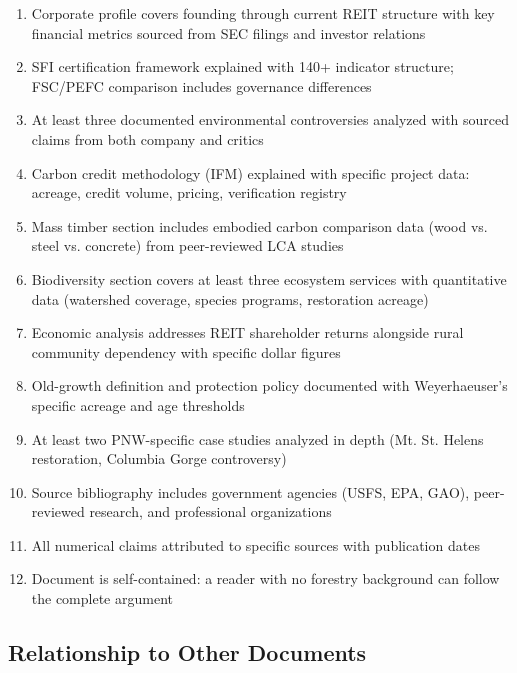 \documentclass[11pt,letterpaper]{article}
\begin{document}
\begin{enumerate}[leftmargin=2em]
\item Corporate profile covers founding through current REIT structure with key financial metrics sourced from SEC filings and investor relations
\item SFI certification framework explained with 140+ indicator structure; FSC/PEFC comparison includes governance differences
\item At least three documented environmental controversies analyzed with sourced claims from both company and critics
\item Carbon credit methodology (IFM) explained with specific project data: acreage, credit volume, pricing, verification registry
\item Mass timber section includes embodied carbon comparison data (wood vs. steel vs. concrete) from peer-reviewed LCA studies
\item Biodiversity section covers at least three ecosystem services with quantitative data (watershed coverage, species programs, restoration acreage)
\item Economic analysis addresses REIT shareholder returns alongside rural community dependency with specific dollar figures
\item Old-growth definition and protection policy documented with Weyerhaeuser's specific acreage and age thresholds
\item At least two PNW-specific case studies analyzed in depth (Mt. St. Helens restoration, Columbia Gorge controversy)
\item Source bibliography includes government agencies (USFS, EPA, GAO), peer-reviewed research, and professional organizations
\item All numerical claims attributed to specific sources with publication dates
\item Document is self-contained: a reader with no forestry background can follow the complete argument
\end{enumerate}

\subsection{Relationship to Other Documents}
\end{document}
